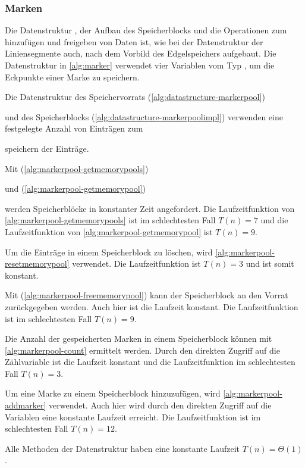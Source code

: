 \subsubsection{Marken} %
\label{sub:marken}

Die Datenstruktur , der Aufbau des Speicherblocks und die Operationen zum hinzufügen und freigeben von
 Daten ist, wie bei der Datenstruktur der Liniensegmente auch, nach dem Vorbild des Edgelspeichers aufgebaut. Die
 Datenstruktur in \autoref{alg:marker} verwendet vier Variablen vom Typ , um die Eckpunkte einer Marke
 zu speichern.


Die Datenstruktur des Speichervorrats (\autoref{alg:datastructure-markerpool})

und des Speicherblocks (\autoref{alg:datastructure-markerpoolimpl}) verwenden eine festgelegte Anzahl von Einträgen zum

speichern der Einträge.

Mit  (\autoref{alg:markerpool-getmemorypools})

und  (\autoref{alg:markerpool-getmemorypool})

werden Speicherblöcke in konstanter Zeit angefordert. Die Laufzeitfunktion von \autoref{alg:markerpool-getmemorypools}
 ist im schlechtesten Fall $T(n) = 7$ und die Laufzeitfunktion von \autoref{alg:markerpool-getmemorypool} ist
 $T(n) = 9$.

Um die Einträge in einem Speicherblock zu löschen, wird \autoref{alg:markerpool-resetmemorypool} verwendet. Die
 Laufzeitfunktion ist $T(n) = 3$ und ist somit konstant.


Mit  (\autoref{alg:markerpool-freememorypool}) kann der Speicherblock an den Vorrat
 zurückgegeben werden. Auch hier ist die Laufzeit konstant. Die Laufzeitfunktion ist im schlechtesten Fall $T(n) = 9$.


Die Anzahl der gespeicherten Marken in einem Speicherblock können mit \autoref{alg:markerpool-count} ermittelt werden.
 Durch den direkten Zugriff auf die Zählvariable ist die Laufzeit konstant und die Laufzeitfunktion im schlechtesten
 Fall $T(n) = 3$.


Um eine Marke zu einem Speicherblock hinzuzufügen, wird \autoref{alg:markerpool-addmarker} verwendet. Auch hier wird
 durch den direkten Zugriff auf die Variablen eine konstante Laufzeit erreicht. Die Laufzeitfunktion ist im
 schlechtesten Fall $T(n) = 12$.


Alle Methoden der Datenstruktur  haben eine konstante Laufzeit $T(n)=\Theta(1)$.
